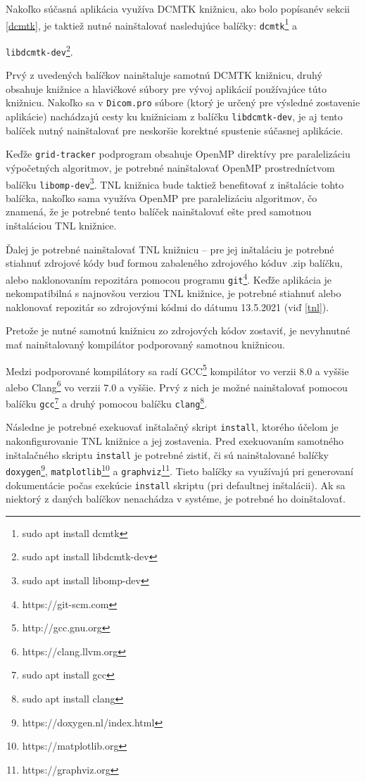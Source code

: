 Nakoľko súčasná aplikácia využíva DCMTK knižnicu, ako bolo popísané\newline v sekcii \ref{dcmtk}, je taktiež nutné nainštalovať nasledujúce balíčky: \texttt{dcmtk}\footnote{sudo apt install dcmtk} \newline a {\texttt{libdcmtk-dev}\footnote{sudo apt install libdcmtk-dev}.

Prvý z uvedených balíčkov nainštaluje samotnú DCMTK knižnicu, druhý obsahuje knižnice a hlavičkové súbory pre vývoj aplikácií používajúce túto knižnicu. Nakoľko sa v \texttt{Dicom.pro} súbore (ktorý je určený pre výsledné zostavenie aplikácie) nachádzajú cesty ku knižniciam z balíčku \texttt{libdcmtk-dev}, je aj tento balíček nutný nainštalovať pre neskoršie korektné spustenie súčasnej aplikácie.

Keďže \texttt{grid-tracker} podprogram obsahuje OpenMP direktívy pre paralelizáciu výpočetných algoritmov, je potrebné nainštalovať OpenMP prostredníctvom balíčku \texttt{libomp-dev}\footnote{sudo apt install libomp-dev}. TNL knižnica bude taktiež benefitovať z inštalácie tohto balíčka, nakoľko sama využíva OpenMP pre paralelizáciu algoritmov, čo znamená, že je potrebné tento balíček nainštalovať ešte pred samotnou inštaláciou TNL knižnice.

Ďalej je potrebné nainštalovať TNL knižnicu -- pre jej inštaláciu je potrebné stiahnuť zdrojové kódy buď formou zabaleného zdrojového kódu\newline v .zip balíčku, alebo naklonovaním repozitára pomocou programu \texttt{git}\footnote{https://git-scm.com}. Keďže aplikácia je nekompatibilná s najnovšou verziou TNL knižnice, je potrebné stiahnuť alebo naklonovať repozitár so zdrojovými kódmi do dátumu 13.5.2021 (viď \ref{tnl}).

Pretože je nutné samotnú knižnicu zo zdrojových kódov zostaviť, je nevyhnutné mať nainštalovaný kompilátor podporovaný samotnou knižnicou.

Medzi podporované kompilátory sa radí GCC\footnote{http://gcc.gnu.org} kompilátor vo verzii 8.0 a vyššie alebo Clang\footnote{https://clang.llvm.org} vo verzii 7.0 a vyššie. Prvý z nich je možné nainštalovať pomocou balíčku \texttt{gcc}\footnote{sudo apt install gcc} a druhý pomocou balíčku \texttt{clang}\footnote{sudo apt install clang}.

Následne je potrebné exekuovať inštalačný skript \texttt{install}, ktorého účelom je nakonfigurovanie TNL knižnice a jej zostavenia.
Pred exekuovaním samotného inštalačného skriptu \texttt{install} je potrebné zistiť, či sú nainštalované balíčky \texttt{doxygen}\footnote{https://doxygen.nl/index.html}, \texttt{matplotlib}\footnote{https://matplotlib.org} a \texttt{graphviz}\footnote{https://graphviz.org}. Tieto balíčky sa využívajú pri generovaní dokumentácie počas exekúcie \texttt{install} skriptu (pri defaultnej inštalácii). Ak sa niektorý z daných balíčkov nenachádza v systéme, je potrebné ho doinštalovať.

}
